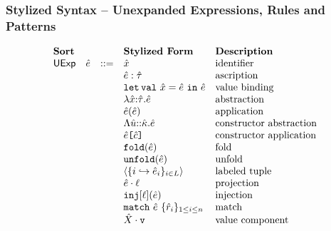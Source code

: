 \clearpage

\subsubsection{Stylized Syntax -- Unexpanded Expressions, Rules and Patterns}
\[\begin{array}{lllllll}
\textbf{Sort} & & 
& \textbf{Stylized Form} & \textbf{Description}\\
\mathsf{UExp} & {\hat e} & ::= 
& {\hat x} & \text{identifier}\\
&&
& {\hat e} : {\hat\tau} & \text{ascription}\\
&&
& \texttt{let\,val}~{\hat x}={\hat e}~\texttt{in}~{\hat e} & \text{value binding}\\
&&
& \lambda {\hat x}{:}{\hat\tau}.{\hat e} & \text{abstraction}\\
&&
& {\hat e}({\hat e}) & \text{application}\\
&&
& \Lambda {\hat u}{::}{\hat\kappa}.{\hat e} & \text{constructor abstraction}\\
&&
& {\hat e}\texttt{[}{\hat c}\texttt{]} & \text{constructor application}\\
&&
& \texttt{fold}({\hat e}) & \text{fold}\\
&&
& \texttt{unfold}({\hat e}) & \text{unfold}\\
&&
& \langle \{i \hookrightarrow {\hat e}_{i}\}_{i \in L}\rangle & \text{labeled tuple}\\
&&
& {\hat e} \cdot \ell & \text{projection}\\
&&
& \texttt{inj}[\ell]({\hat e}) & \text{injection}\\
&&
& \texttt{match}~{\hat e}~\{\hat{r}_{i}\}_{1 \leq i \leq n} & \text{match}\\
&&
& {\hat X} \cdot \texttt{v} & \text{value component}\\

\end{array}\]
